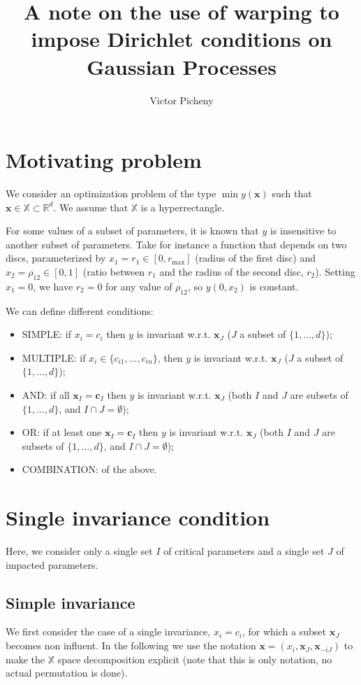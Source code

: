 \documentclass[a4paper,10pt]{article}
\title{A note on the use of warping to impose Dirichlet conditions on Gaussian Processes}
\author{Victor Picheny}
\newcommand{\x}{\mathbf{x}}
\newcommand{\cc}{\mathbf{c}}
\newcommand{\Rset}{\mathbb{R}}
\newcommand{\Xset}{\mathbb{X}}
\begin{document}
\maketitle

\section{Motivating problem}
We consider an optimization problem of the type $\min y(\x)$ such that $\x \in \Xset \subset \Rset^d$.
We assume that $\Xset$ is a hyperrectangle.

For some values of a subset of parameters, it is known that $y$ is insensitive to another subset of parameters. 
Take for instance a function that depends on two discs, parameterized by $x_1=r_1 \in [0, r_{\max}]$ (radius of the first disc) and $x_2=\rho_{12} \in [0,1]$ 
(ratio between $r_1$ and the radius of the second disc, $r_2$). Setting $x_1=0$, we have $r_2=0$ for any value of $\rho_{12}$, so $y(0, x_2)$ is constant.

We can define different conditions:
\begin{itemize}
 \item SIMPLE: if $x_i = c_i$ then $y$ is invariant w.r.t.  $\x_J$ ($J$ a subset of $\{1, \ldots, d\}$); 
 \item MULTIPLE: if $x_i \in \{c_{i1}, \ldots, c_{in}\}$, then $y$ is invariant w.r.t.  $\x_J$ ($J$ a subset of $\{1, \ldots, d\}$); 
 \item AND: if all $\x_I = \cc_I$ then $y$ is invariant w.r.t.  $\x_J$ (both $I$ and $J$ are subsets of $\{1, \ldots, d\}$, and $I \cap J = \emptyset$);
 \item OR: if at least one $\x_I = \cc_I$ then $y$ is invariant w.r.t.  $\x_J$ (both $I$ and $J$ are subsets of $\{1, \ldots, d\}$, and $I \cap J = \emptyset$);
 \item COMBINATION: of the above.
\end{itemize}

\section{Single invariance condition}
Here, we consider only a single set $I$ of critical parameters and a single set $J$ of impacted parameters.

\subsection{Simple invariance}
We first consider the case of a single invariance, $x_i = c_i$, for which a subset $\x_J$ becomes non influent. 
In the following we use the notation $\x = (x_i, \x_J, \x_{-iJ})$ to make the $\Xset$ space decomposition explicit (note that this is only notation, 
no actual permutation is done).
\end{document}
